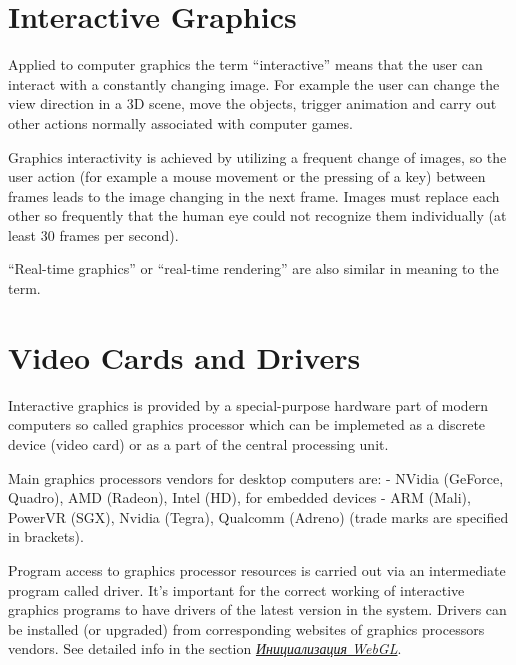 \documentclass[a4paper,12pt,oneside]{sphinxmanual}
\begin{document}

\section{Interactive Graphics}
\label{about:about-interactive-graphics}\label{about:id12}\label{about:index-9}
Applied to computer graphics the term ``interactive'' means that the user can interact with a constantly changing image. For example the user can change the view direction in a 3D scene, move the objects, trigger animation and carry out other actions normally associated with computer games.

Graphics interactivity is achieved by utilizing a frequent change of images, so the user action (for example a mouse movement or the pressing of a key) between frames leads to the image changing in the next frame. Images must replace each other so frequently that the human eye could not recognize them individually (at least 30 frames per second).

``Real-time graphics'' or ``real-time rendering'' are also similar in meaning to the term.


\section{Video Cards and Drivers}
\label{about:id13}\label{about:about-drivers-video-cards}\label{about:index-10}
Interactive graphics is provided by a special-purpose hardware part of modern computers so called graphics processor which can be implemeted as a discrete device (video card) or as a part of the central processing unit.

Main graphics processors vendors for desktop computers are:  - NVidia (GeForce, Quadro), AMD (Radeon), Intel (HD), for embedded devices - ARM (Mali), PowerVR (SGX), Nvidia (Tegra), Qualcomm (Adreno) (trade marks are specified in brackets).

Program access to graphics processor resources is carried out via an intermediate program called driver. It's important for the correct working of interactive graphics programs to have drivers of the latest version in the system. Drivers can be installed (or upgraded) from corresponding websites of graphics processors vendors. See detailed info in the section {\hyperref[problems_and_solutions:webgl-not-working]{\emph{Инициализация WebGL}}}.

\end{document}

